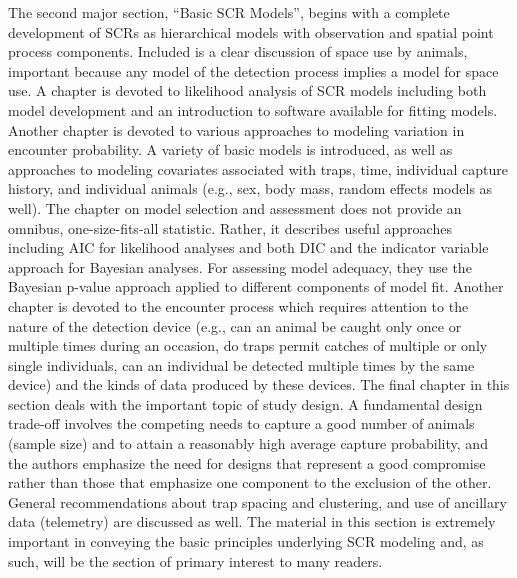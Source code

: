 The second major section, ``Basic SCR Models'',
begins with a complete development of SCRs as hierarchical models with
observation and spatial point process components. Included is a clear
discussion of space use by animals, important because any model of the
detection process implies a model for space use. A chapter is devoted
to likelihood analysis of SCR models including both model development
and an introduction to software available for fitting models. Another
chapter is devoted to various approaches to modeling variation in
encounter probability. A variety of basic models is introduced, as
well as approaches to modeling covariates associated with traps, time,
individual capture history, and individual animals (e.g., sex, body
mass, random effects models as well). The chapter on model selection
and assessment does not provide an omnibus, one-size-fits-all
statistic. Rather, it describes useful approaches including AIC for
likelihood analyses and both DIC and the \citet{kuo_mallick:1998}
indicator variable approach for Bayesian analyses. For assessing model
adequacy, they use the Bayesian p-value approach \citep{gelman_etal:1996}
applied to different components of model fit. Another chapter is
devoted to the encounter process which requires attention to the
nature of the detection device (e.g., can an animal be caught only
once or multiple times during an occasion, do traps permit catches of
multiple or only single individuals, can an individual be detected
multiple times by the same device) and the kinds of data produced by
these devices. The final chapter in this section deals with the
important topic of study design. A fundamental design trade-off
involves the competing needs to capture a good number of animals
(sample size) and to attain a reasonably high average capture
probability, and the authors emphasize the need for designs that
represent a good compromise rather than those that emphasize one
component to the exclusion of the other. General recommendations about
trap spacing and clustering, and use of ancillary data (telemetry) are
discussed as well. The material in this section is extremely important
in conveying the basic principles underlying SCR modeling and, as
such, will be the section of primary interest to many readers.  

